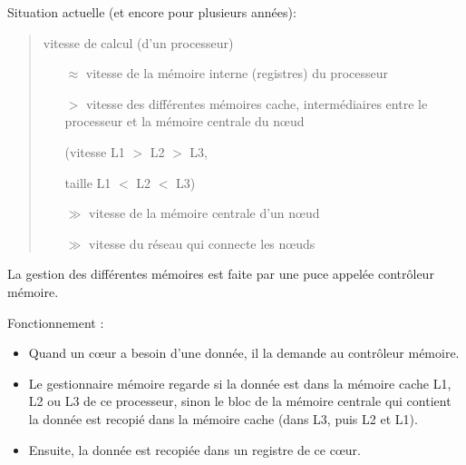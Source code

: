 \documentclass{beamer}
\begin{document}
\begin{frame}[fragile]
Situation actuelle (et encore pour plusieurs ann\'ees): 
\begin{quote}
	
	\vfill
	vitesse de calcul (d'un processeur)
	\vfill
	
	\begin{itemize}
		\item[$\approx$] vitesse de la m\'emoire interne (registres) du processeur
			\medskip
	        
		\item[$>$] vitesse des diff\'erentes m\'emoires cache, interm\'ediaires entre le processeur et la m\'emoire centrale du n\oe ud
		
		\hfill (vitesse L1 $>$ L2 $>$ L3, 
		
		\hfill taille L1 $<$ L2 $<$ L3)
			\medskip
			
		\item[$\gg$] vitesse de la m\'emoire centrale d'un n\oe ud
			\medskip
			
		\item[$\gg$] vitesse du r\'eseau qui connecte les n\oe uds
	\end{itemize}


\end{quote}

\end{frame}

\begin{frame}

La gestion des différentes mémoires est faite par une puce appelée contrôleur mémoire.
\bigskip

Fonctionnement :

\begin{itemize}
	\item Quand un c\oe ur  a besoin d'une donn\'ee, il la demande au contrôleur m\'emoire.
	\vfill
	
	\item Le gestionnaire m\'emoire regarde si la donn\'ee est dans la m\'emoire cache L1, L2 ou L3 de ce processeur, sinon le bloc de la m\'emoire centrale qui contient la donn\'ee est recopi\'e dans la m\'emoire cache (dans L3, puis L2 et  L1).
	
	\vfill
	\item Ensuite, la donn\'ee est recopi\'ee dans un registre de ce c\oe ur.
	
	\vfill
\end{itemize}
\end{frame}
\end{document}
